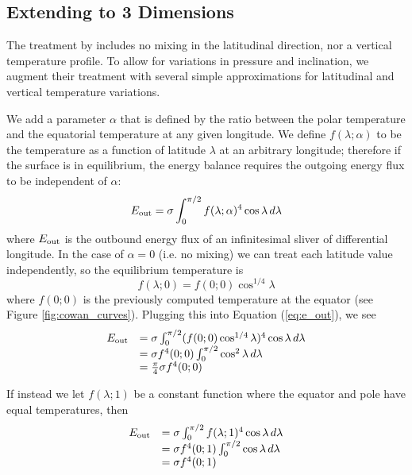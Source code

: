 \documentclass[linenumbers,5p,twocolumn,authoryear]{elsarticle}
\begin{document}
\subsection{Extending to 3 Dimensions}

The treatment by \citet{cowan2011} includes no mixing in the latitudinal direction, nor a vertical temperature profile. To allow for variations in pressure and inclination, we augment their treatment with several simple approximations for latitudinal and vertical temperature variations. 

We add a parameter $\alpha$ that is defined by the ratio between the polar temperature and the equatorial temperature at any given longitude. We define $f(\lambda;\alpha)$ to be the temperature as a function of latitude $\lambda$ at an arbitrary longitude; therefore if the surface is in equilibrium, the energy balance requires the outgoing energy flux to be independent of $\alpha$:
\begin{equation}
    \label{eq:e_out}
    E_{\rm out} = \sigma \int_0^{\pi/2} f(\lambda; \alpha)^4 \cos{\lambda}\,d\lambda
\end{equation}
where $E_{\rm out}$ is the outbound energy flux of an infinitesimal sliver of differential longitude. In the case of $\alpha=0$ (i.e. no mixing) we can treat each latitude value independently, so the equilibrium temperature is
\begin{equation}
    f(\lambda; 0) = f(0;0) \cos^{1/4}{\lambda}
\end{equation}
where $f(0;0)$ is the previously computed temperature at the equator (see Figure \ref{fig:cowan_curves}). Plugging this into Equation (\ref{eq:e_out}), we see
\begin{equation}
    \label{eq:nomix}
    \begin{array}{cl}
        E_{\rm out} & = \sigma \int_0^{\pi/2} (f(0;0) \cos^{1/4}{\lambda})^4\cos{\lambda}\,d\lambda \\
        & = \sigma f^4(0;0) \int_0^{\pi/2} \cos^{2}{\lambda}\,d\lambda \\
        & = \frac{\pi}{4}\sigma f^4(0;0)
    \end{array}
\end{equation}

If instead we let $f(\lambda;1)$ be a constant function where the equator and pole have equal temperatures, then
\begin{equation}
    \label{eq:allmix}
    \begin{array}{cl}
        E_{\rm out} & = \sigma \int_0^{\pi/2} f(\lambda;1)^4 \cos{\lambda}\,d\lambda \\
        & = \sigma f^4(0;1) \int_0^{\pi/2} \cos{\lambda}\,d\lambda \\
        & = \sigma f^4(0;1)
    \end{array}
\end{equation}
\end{document}

